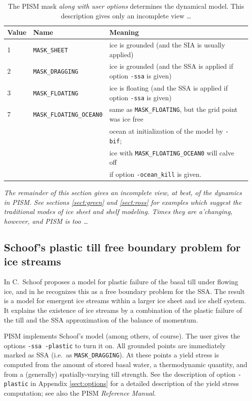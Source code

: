 \documentclass[11pt,final]{amsart}
\newcommand{\pismoptionindex}[1]{\index{options for PISM (and PETSc)!\texttt{-#1}}}
\newcommand{\intextoption}[1]{\texttt{-#1}\pismoptionindex{#1}}
\begin{document}
\begin{table}[ht]
\caption{The PISM mask \emph{along with user options} determines the dynamical model.  This description gives only an incomplete view \dots}\label{tab:maskvals} 
\small
\begin{tabular}{@{}llll}\hline
\textbf{Value} & \textbf{Name} & \textbf{Meaning}\\ \hline
1 & \verb|MASK_SHEET| & ice is grounded (and the SIA is usually applied) \\
2 & \verb|MASK_DRAGGING| & ice is grounded (and the SSA is applied if option \verb|-ssa| is given) \\
3 & \verb|MASK_FLOATING| & ice is floating (and the SSA is applied if option \verb|-ssa| is given) \\
7 & \verb|MASK_FLOATING_OCEAN0| & same as \verb|MASK_FLOATING|, but the grid point was ice free   \\
 & & ocean at initialization of the model by \verb|-bif|;  \\
 & & ice with \verb|MASK_FLOATING_OCEAN0| will calve off  \\
 & & if option \verb|-ocean_kill| is given.\\
\hline\end{tabular}
\normalsize
\end{table}

\emph{The remainder of this section gives an incomplete view, at best, of the dynamics in PISM.  See sections \ref{sect:green} and \ref{sect:ross} for examples which suggest the traditional modes of ice sheet and shelf modeling.  Times they are a'changing, however, and PISM is too \dots}


\subsection{Schoof's plastic till free boundary problem for ice streams} \label{subsect:plastic}    In \cite{SchoofTill} C.~Schoof proposes a model for plastic failure of the basal till under flowing ice, and in \cite{SchoofStream} he recognizes this as a free boundary problem for the SSA.  The result is a model for emergent ice streams within a larger ice sheet and ice shelf system.  It explains the existence of ice streams by a combination of the plastic failure of the till and the SSA approximation of the balance of momentum.

PISM implements Schoof's model (among others, of course).  The user gives the options \verb|-ssa -plastic| to turn it on.  All grounded points are immediately marked as SSA (i.e.~as \verb|MASK_DRAGGING|).  At these points a yield stress is computed from the amount of stored basal water, a thermodynamic quantity, and from a (generally) spatially-varying till strength.  See the description of option \intextoption{plastic} in Appendix \ref{sect:options} for a detailed description of the yield stress computation; see also the PISM \emph{Reference Manual}.
\end{document}
